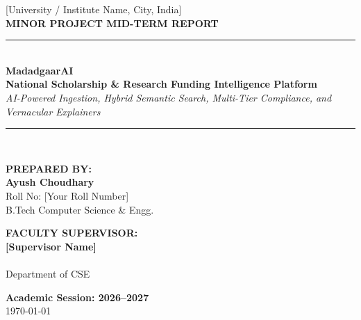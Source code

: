 \documentclass[12pt,a4paper]{article}
\begin{document}
	
\begin{titlepage}
    \centering
    \vspace*{0.5cm}
    
    
    \vspace{0.4cm}
    {\large [University / Institute Name, City, India]}\\[1.2cm]
    
    {\Large \textbf{\color{accentColor} MINOR PROJECT MID-TERM REPORT}}\\[0.4cm]
    \rule{0.9\textwidth}{1.5pt}\\[0.4cm]
    {\huge \bfseries \color{primaryColor} MadadgaarAI}\\[0.3cm]
    {\large \textbf{National Scholarship \& Research Funding Intelligence Platform}}\\[0.2cm]
    {\small \textit{AI-Powered Ingestion, Hybrid Semantic Search, Multi-Tier Compliance, and Vernacular Explainers}}\\[0.4cm]
    \rule{0.9\textwidth}{1.5pt}\\[1.5cm]
    
    \begin{minipage}{0.48\textwidth}
        \begin{flushleft} \normalsize
            \textbf{\color{primaryColor} PREPARED BY:}\\[0.2cm]
            \textbf{Ayush Choudhary} \\
            Roll No: [Your Roll Number]\\
            B.Tech Computer Science \& Engg.
        \end{flushleft}
    \end{minipage}
    \hfill
    \begin{minipage}{0.48\textwidth}
        \begin{flushright} \normalsize
            \textbf{\color{primaryColor} FACULTY SUPERVISOR:}\\[0.2cm]
            \textbf{[Supervisor Name]}\\
            [Designation]\\
            Department of CSE
        \end{flushright}
    \end{minipage}
    
    \vfill
    {\large \textbf{Academic Session: 2026--2027}}\\[0.2cm]
    {\small \today}
\end{titlepage}
	
\end{document}
